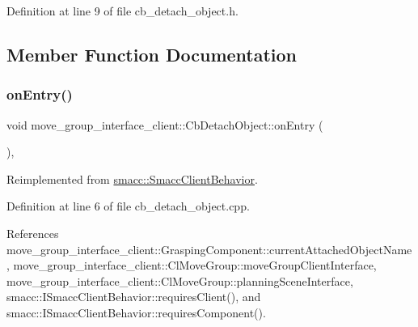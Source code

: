 Definition at line 9 of file cb\+\_\+detach\+\_\+object.\+h.



\subsection{Member Function Documentation}
\mbox{\label{classmove__group__interface__client_1_1CbDetachObject_aaed049b8c346b38a82acb4641aa90df6}} 
\subsubsection{\texorpdfstring{on\+Entry()}{onEntry()}}
{\footnotesize\ttfamily void move\+\_\+group\+\_\+interface\+\_\+client\+::\+Cb\+Detach\+Object\+::on\+Entry (\begin{DoxyParamCaption}{ }\end{DoxyParamCaption})\hspace{0.3cm}{\ttfamily [override]}, {\ttfamily [virtual]}}



Reimplemented from \hyperlink{classsmacc_1_1SmaccClientBehavior_ad5d3e1f1697c3cfe66c94cadba948493}{smacc\+::\+Smacc\+Client\+Behavior}.



Definition at line 6 of file cb\+\_\+detach\+\_\+object.\+cpp.



References move\+\_\+group\+\_\+interface\+\_\+client\+::\+Grasping\+Component\+::current\+Attached\+Object\+Name, move\+\_\+group\+\_\+interface\+\_\+client\+::\+Cl\+Move\+Group\+::move\+Group\+Client\+Interface, move\+\_\+group\+\_\+interface\+\_\+client\+::\+Cl\+Move\+Group\+::planning\+Scene\+Interface, smacc\+::\+I\+Smacc\+Client\+Behavior\+::requires\+Client(), and smacc\+::\+I\+Smacc\+Client\+Behavior\+::requires\+Component().


